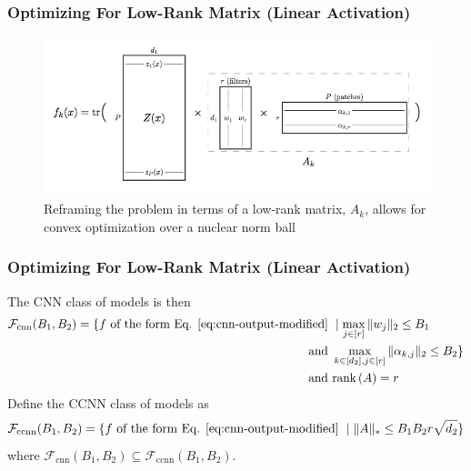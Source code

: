 \documentclass[hyperref={colorlinks}]{beamer}
\newcommand{\rank}[1]{\text{rank}\left(#1\right)}
\begin{document}
\begin{frame}
	\frametitle{Optimizing For Low-Rank Matrix (Linear Activation)}
	\begin{figure}
		\includegraphics[scale=0.3]{Linear-Case-Structure.png}
		\caption{Reframing the problem in terms of a low-rank matrix, $A_k$, allows for convex optimization over a nuclear norm ball}
		\label{fig:linear-case-structure}
	\end{figure}
\end{frame}

\begin{frame}
	\frametitle{Optimizing For Low-Rank Matrix (Linear Activation)}
	The CNN class of models is then
	\begin{align}
		\mathcal{F}_{\text{cnn}}(B_1, B_2) = \{f \text{ of the form Eq. \ref{eq:cnn-output-modified} } & \mid \max_{j \in [r]} \|w_j\|_2 \leq B_1 \\ \nonumber
		\text{ and } & \max_{k \in [d_2], j \in [r]} \|\alpha_{k, j}\|_2 \leq B_2\} \\ \nonumber
		\text{ and } & \rank{A} = r
		\label{eq:fcnn-class-modified}
	\end{align}
	Define the CCNN class of models as
	\begin{equation}
		\mathcal{F}_{\text{ccnn}}(B_1, B_2) = \{f \text{ of the form Eq. \ref{eq:cnn-output-modified} } \mid \|A\|_* \leq B_1 B_2 r \sqrt{d_2}\}
		\label{eq:fccnn-class}
	\end{equation}
	where $\mathcal{F}_{\text{cnn}}(B_1, B_2) \subseteq \mathcal{F}_{\text{ccnn}}(B_1, B_2)$.
\end{frame}
\end{document}
